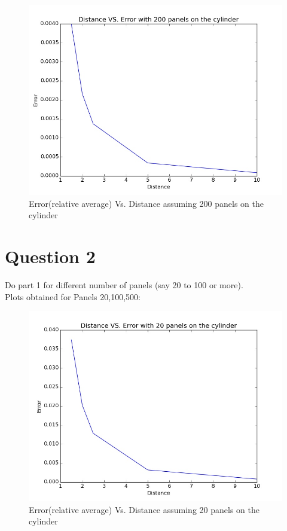 \documentclass{article}
\begin{document}
\begin{figure}[H]  \label{figure}
\includegraphics[width=12cm]{result1.jpg}
\caption{Error(relative average) Vs. Distance assuming 200 panels on the cylinder}
\label{figure:}
\end{figure}

\section*{Question 2}
Do part 1 for different number of panels (say 20 to 100 or more).
\\
Plots obtained for Panels 20,100,500:
\begin{figure}[H] \label{figure}
\includegraphics[width=12cm]{result2.jpg}
\caption{Error(relative average) Vs. Distance assuming 20 panels on the cylinder}
\label{figure:}
\end{figure}
\end{document}
